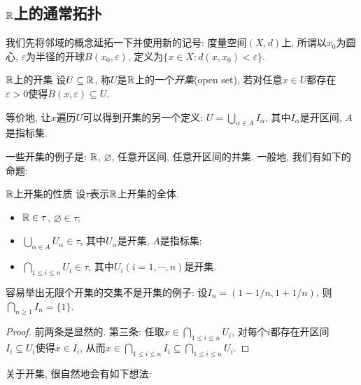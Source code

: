 \subsection{$\mathbb{R}$上的通常拓扑}

我们先将邻域的概念延拓一下并使用新的记号: 度量空间$(X,d)$上, 所谓以$x_0$为圆心, $\varepsilon$为半径的开球$B(x_0,\varepsilon)$, 定义为$\{ x \in X:d(x,x_0)<\varepsilon \}$. 

\begin{definition}{$\mathbb{R}$上的开集}
	设$U \subseteq \mathbb{R}$, 称$U$是$\mathbb{R}$上的一个\textit{开集}(open set), 若对任意$x \in U$都存在$\varepsilon >0$使得$B(x,\varepsilon) \subseteq U$. 
\end{definition}
\begin{remark}
	等价地, 让$x$遍历$U$可以得到开集的另一个定义: $U=\bigcup_{\alpha \in A} I_{\alpha}$, 其中$I_{\alpha}$是开区间, $A$是指标集. 
\end{remark}

一些开集的例子是: $\mathbb{R}$, $\varnothing$, 任意开区间, 任意开区间的并集. 一般地, 我们有如下的命题: 

\begin{proposition}{$\mathbb{R}$上开集的性质}
	设$\tau$表示$\mathbb{R}$上开集的全体. 
	\begin{itemize}
		\item $\mathbb{R} \in \tau$, $\varnothing \in \tau$; 
		\item $\bigcup_{\alpha \in A} U_{\alpha} \in \tau$, 其中$U_{\alpha}$是开集, $A$是指标集; 
		\item $\bigcap_{1 \leq i \leq n} U_i \in \tau$, 其中$U_i(i=1,\cdots ,n)$是开集. 
	\end{itemize}
\end{proposition}
\begin{remark}
	容易举出无限个开集的交集不是开集的例子: 设$I_n=(1-1/n,1+1/n)$, 则$\bigcap_{n\geq 1}I_n = \{ 1 \}$. 
\end{remark}
\begin{proof}
	前两条是显然的. 第三条: 任取$x \in \bigcap_{1 \leq i \leq n} U_i$, 对每个$i$都存在开区间$I_i \subseteq U_i$使得$x \in I_i$, 从而$x \in \bigcap_{1 \leq i \leq n} I_i \subseteq \bigcap_{1 \leq i \leq n} U_i$. 
\end{proof}

关于开集, 很自然地会有如下想法: 

